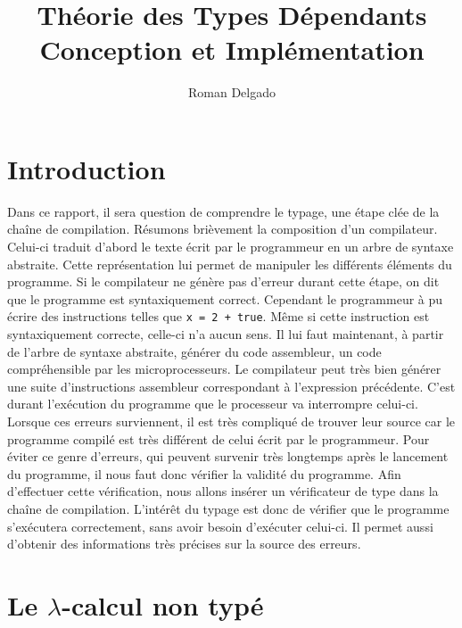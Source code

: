 \documentclass {article}
\title{Théorie des Types Dépendants\\Conception et Implémentation}
\author{Roman Delgado}
\date{}
\theoremstyle{definition}
\theoremstyle{remark}
\begin{document}
\maketitle



\vfill
\setcounter{tocdepth}{2}
\tableofcontents
\vfill

\clearpage


\section{Introduction}



Dans ce rapport, il sera question de comprendre le typage, une  étape clée de la chaîne de compilation.
Résumons brièvement la composition d'un compilateur.
Celui-ci traduit d'abord le texte écrit par le programmeur en un arbre de syntaxe abstraite. Cette représentation lui permet
de manipuler les différents éléments du programme.
Si le compilateur ne génère pas d'erreur durant cette étape, on dit que le programme est syntaxiquement correct. Cependant 
le programmeur à pu écrire des instructions telles que \lstinline!x = 2 + true!. Même si cette instruction est syntaxiquement correcte, celle-ci 
n'a aucun sens. Il lui faut maintenant, à partir de l'arbre de syntaxe abstraite, générer du code assembleur, un code compréhensible 
par les microprocesseurs. Le compilateur peut très bien générer une suite d'instructions assembleur correspondant à l'expression 
précédente. C'est durant l'exécution du programme que le processeur va interrompre celui-ci. Lorsque ces erreurs surviennent, il est 
très compliqué de trouver leur source car le programme compilé est très différent de celui écrit par le programmeur.
Pour éviter ce genre d'erreurs, qui peuvent survenir très longtemps après le lancement du programme, 
il nous faut donc vérifier la validité du programme. Afin d'effectuer cette vérification, nous allons insérer un vérificateur
de type dans la chaîne de compilation.
L'intérêt du typage est donc de vérifier que le programme s'exécutera correctement, sans avoir besoin d'exécuter celui-ci. 
Il permet aussi d'obtenir des informations très précises sur la source des erreurs.

\section{Le $\lambda$-calcul non typé}
\label{sec:untyped}
\end{document}

